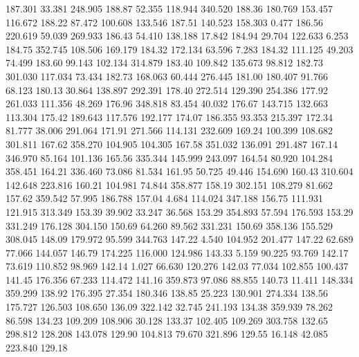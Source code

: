  187.301   33.381  248.905       188.87
  52.355  118.944  340.520       188.36
 180.769  153.457  116.672       188.22
  87.472  100.608  133.546       187.51
 140.523  158.303    0.477       186.56
 220.619   59.039  269.933       186.43
  54.410  138.188   17.842       184.94
  29.704  122.633    6.253       184.75
 352.745  108.506  169.179       184.32
 172.134   63.596    7.283       184.32
 111.125   49.203   74.499       183.60
  99.143  102.134  314.879       183.40
 109.842  135.673   98.812       182.73
 301.030  117.034   73.434       182.73
 168.063   60.444  276.445       181.00
 180.407   91.766   68.123       180.13
  30.864  138.897  292.391       178.40
 272.514  129.390  254.386       177.92
 261.033  111.356   48.269       176.96
 348.818   83.454   40.032       176.67
 143.715  132.663  113.304       175.42
 189.643  117.576  192.177       174.07
 186.355   93.353  215.397       172.34
  81.777   38.006  291.064       171.91
 271.566  114.131  232.609       169.24
 100.399  108.682  301.811       167.62
 358.270  104.905  104.305       167.58
 351.032  136.091  291.487       167.14
 346.970   85.164  101.136       165.56
 335.344  145.999  243.097       164.54
  80.920  104.284  358.451       164.21
 336.460   73.086   81.534       161.95
  50.725   49.446  154.690       160.43
 310.604  142.648  223.816       160.21
 104.981   74.844  358.877       158.19
 302.151  108.279   81.662       157.62
 359.542   57.995  186.788       157.04
   4.684  114.024  347.188       156.75
 111.931  121.915  313.349       153.39
  39.902   33.247   36.568       153.29
 354.893   57.594  176.593       153.29
 331.249  176.128  304.150       150.69
  64.260   89.562  331.231       150.69
 358.136  155.529  308.045       148.09
 179.972   95.599  344.763       147.22
   4.540  104.952  201.477       147.22
  62.689   77.066  144.057       146.79
 174.225  116.000  124.986       143.33
   5.159   90.225   93.769       142.17
  73.619  110.852   98.969       142.14
   1.027   66.630  120.276       142.03
  77.034  102.855  100.437       141.45
 176.356   67.233  114.472       141.16
 359.873   97.086   88.855       140.73
  11.411  148.334  359.299       138.92
 176.395   27.354  180.346       138.85
  25.223  130.901  274.334       138.56
 175.727  126.503  108.650       136.09
 322.142   32.745  241.193       134.38
 359.939   78.262   86.598       134.23
 109.209  108.906   30.128       133.37
 102.405  109.269  303.758       132.65
 298.812  128.208  143.078       129.90
 104.813   79.670  321.896       129.55
  16.148   42.085  223.840       129.18

